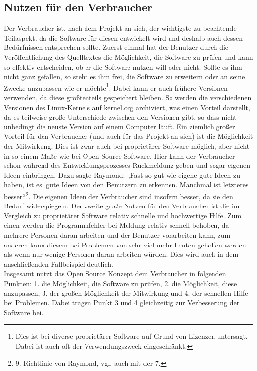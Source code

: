 \documentclass[a4paper,12pt]{article}
\begin{document}
\subsection{Nutzen für den Verbraucher}
Der Verbraucher ist, nach dem Projekt an sich, der wichtigste zu beachtende Teilaspekt, da die Software für diesen entwickelt wird und deshalb auch dessen Bedürfnissen entsprechen sollte. Zuerst einmal hat der Benutzer durch die Veröffentlichung des Quelltextes die Möglichkeit, die Software zu prüfen und kann so effektiv entscheiden, ob er die Software nutzen will oder nicht. Sollte es ihm nicht ganz gefallen, so steht es ihm frei, die Software zu erweitern oder an seine Zwecke anzupassen wie er möchte\footnote{Dies ist bei diverse proprietärer Software auf Grund von Lizenzen untersagt. Dabei ist auch oft der Verwendungszweck eingeschränkt.}. Dabei kann er auch frühere Versionen verwenden, da diese größtenteils gespeichert bleiben. So werden die verschiedenen Versionen des Linux-Kernels auf kernel.org archiviert, was einen Vorteil darstellt, da es teilweise große Unterschiede zwischen den Versionen gibt, so dass nicht unbedingt die neuste Version auf einem Computer läuft. Ein ziemlich großer Vorteil für den Verbraucher (und auch für das Projekt an sich) ist die Möglichkeit der Mitwirkung. Dies ist zwar auch bei proprietärer Software möglich, aber nicht in so einem Maße wie bei Open Source Software. Hier kann der Verbraucher schon während des Entwicklungsprozesses Rückmeldung geben und sogar eigenen Ideen einbringen. Dazu sagte Raymond: „Fast so gut wie eigene gute Ideen zu haben, ist es, gute Ideen von den Benutzern zu erkennen. Manchmal ist letzteres besser“\footnote{9. Richtlinie von Raymond, vgl. auch mit der 7.}. Die eigenen Ideen der Verbraucher sind insofern besser, da sie den Bedarf widerspiegeln. Der zweite große Nutzen für den Verbraucher ist die im Vergleich zu proprietärer Software relativ schnelle und hochwertige Hilfe. Zum einen werden die Programmfehler bei Meldung relativ schnell behoben, da mehrere Personen daran arbeiten und der Benutzer vorarbeiten kann, zum anderen kann diesem bei Problemen von sehr viel mehr Leuten geholfen werden als wenn nur wenige Personen daran arbeiten würden. Dies wird auch in dem anschließenden Fallbeispiel deutlich.
\\Insgesamt nutzt das Open Source Konzept dem Verbraucher in folgenden Punkten: 1. die Möglichkeit, die Software zu prüfen, 2. die Möglichkeit, diese anzupassen, 3. der großen Möglichkeit der Mitwirkung und 4. der schnellen Hilfe bei Problemen. Dabei tragen Punkt 3 und 4 gleichzeitig zur Verbesserung der Software bei.
\end{document}
